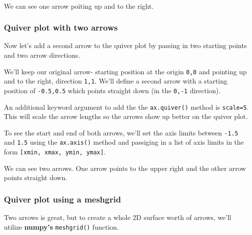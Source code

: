 \documentclass{book}
\begin{document}
    \begin{center}
    \end{center}
    { \hspace*{\fill} \\}
    

    
        We can see one arrow poiting up and to the right.
    




    
        \subsubsection{Quiver plot with two
arrows}\label{quiver-plot-with-two-arrows}

Now let's add a second arrow to the quiver plot by passing in two
starting points and two arrow directions.

We'll keep our original arrow- starting position at the origin
\lstinline!0,0! and pointing up and to the right, direction
\lstinline!1,1!. We'll define a second arrow with a starting position of
\lstinline!-0.5,0.5! which points straight down (in the \lstinline!0,-1!
direction).

An additional keyword argument to add the the \lstinline!ax.quiver()!
method is \lstinline!scale=5!. This will scale the arrow lengths so the
arrows show up better on the quiver plot.

To see the start and end of both arrows, we'll set the axis limits
between \lstinline!-1.5! and \lstinline!1.5! using the
\lstinline!ax.axis()! method and passiging in a list of axis limits in
the form \lstinline![xmin, xmax, ymin, ymax]!.
    




    
        We can see two arrows. One arrow points to the upper right and the other
arrow points straight down.
    




    
        \subsubsection{Quiver plot using a
meshgrid}\label{quiver-plot-using-a-meshgrid}

Two arrows is great, but to create a whole 2D surface worth of arrows,
we'll utilize \textbf{numpy's} \lstinline!meshgrid()! function.
\end{document}
